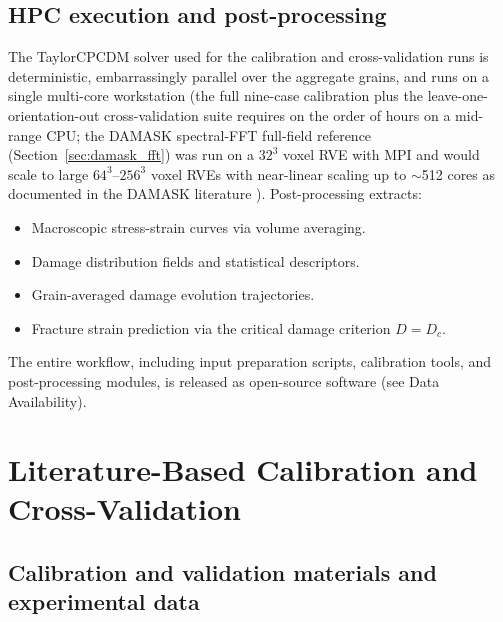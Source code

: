 \documentclass[12pt,a4paper,twocolumn]{article}
\begin{document}
\subsection{HPC execution and post-processing}

The TaylorCPCDM solver used for the calibration and cross-validation runs is deterministic, embarrassingly parallel over the aggregate grains, and runs on a single multi-core workstation (the full nine-case calibration plus the leave-one-orientation-out cross-validation suite requires on the order of hours on a mid-range CPU; the DAMASK spectral-FFT full-field reference (Section~\ref{sec:damask_fft}) was run on a $32^3$ voxel RVE with MPI and would scale to large $64^3$--$256^3$ voxel RVEs with near-linear scaling up to $\sim$512 cores as documented in the DAMASK literature \cite{roters2019damask}).
Post-processing extracts:

\begin{itemize}
    \item Macroscopic stress-strain curves via volume averaging.
    \item Damage distribution fields and statistical descriptors.
    \item Grain-averaged damage evolution trajectories.
    \item Fracture strain prediction via the critical damage criterion $D = D_c$.
\end{itemize}

The entire workflow, including input preparation scripts, calibration tools, and post-processing modules, is released as open-source software (see Data Availability).

\section{Literature-Based Calibration and Cross-Validation}
\label{sec:validation}

\subsection{Calibration and validation materials and experimental data}
\end{document}
